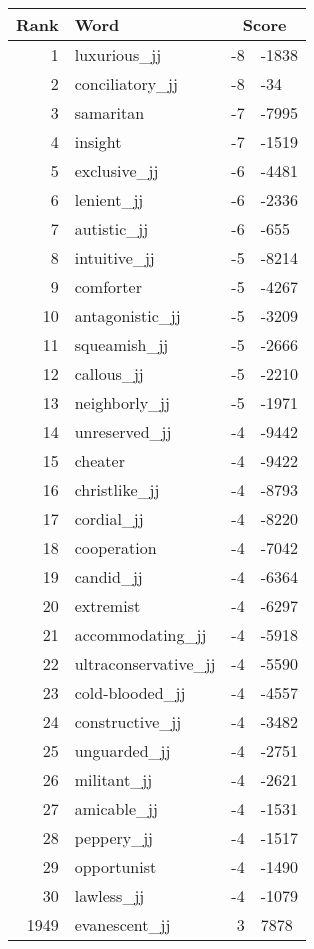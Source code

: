 \begin{longtable}[!htbp]{| rlr@{.}l |}
    \hline
    \textbf{Rank} & \textbf{Word} & \multicolumn{2}{c|}{\textbf{Score}} \\
    \hline
    \endhead
    1 & luxurious\_jj & -8 & -1838 \\
    2 & conciliatory\_jj & -8 & -34 \\
    3 & samaritan & -7 & -7995 \\
    4 & insight & -7 & -1519 \\
    5 & exclusive\_jj & -6 & -4481 \\
    6 & lenient\_jj & -6 & -2336 \\
    7 & autistic\_jj & -6 & -655 \\
    8 & intuitive\_jj & -5 & -8214 \\
    9 & comforter & -5 & -4267 \\
    10 & antagonistic\_jj & -5 & -3209 \\
    11 & squeamish\_jj & -5 & -2666 \\
    12 & callous\_jj & -5 & -2210 \\
    13 & neighborly\_jj & -5 & -1971 \\
    14 & unreserved\_jj & -4 & -9442 \\
    15 & cheater & -4 & -9422 \\
    16 & christlike\_jj & -4 & -8793 \\
    17 & cordial\_jj & -4 & -8220 \\
    18 & cooperation & -4 & -7042 \\
    19 & candid\_jj & -4 & -6364 \\
    20 & extremist & -4 & -6297 \\
    21 & accommodating\_jj & -4 & -5918 \\
    22 & ultraconservative\_jj & -4 & -5590 \\
    23 & cold-blooded\_jj & -4 & -4557 \\
    24 & constructive\_jj & -4 & -3482 \\
    25 & unguarded\_jj & -4 & -2751 \\
    26 & militant\_jj & -4 & -2621 \\
    27 & amicable\_jj & -4 & -1531 \\
    28 & peppery\_jj & -4 & -1517 \\
    29 & opportunist & -4 & -1490 \\
    30 & lawless\_jj & -4 & -1079 \\
    1949 & evanescent\_jj & 3 & 7878 \\

\end{longtable}

